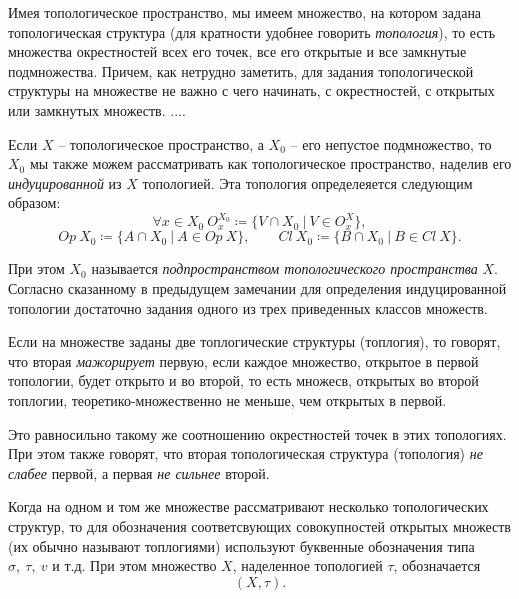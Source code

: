 \begin{remark}
	Имея топологическое пространство, мы имеем множество, на котором задана топологическая структура (для кратности удобнее говорить \emph{топология}), то есть множества окрестностей всех его точек, все его открытые и все замкнутые подмножества. Причем, как нетрудно заметить, для задания топологической структуры на множестве не важно с чего начинать, с окрестностей, с открытых или замкнутых множеств. ....
\end{remark}

\begin{definition}[Подпространство ТП]
	Если $X$ -- топологическое пространство, а $X_0$ -- его непустое подмножество, то $X_0$ мы также можем рассматривать как топологическое пространство, наделив его \emph{индуцированной} из $X$ топологией. Эта топология определеяется следующим образом:
	\[
		\forall x \in X_0 \ O_{x}^{X_0} \coloneq \big\{V \cap X_0 \ \big| \ V \in O_{x}^{X} \big\},
	\]
	\[
		Op \ X_0 \coloneq \big\{A \cap X_0 \ \big| \ A \in Op \ X\big\}, \qquad Cl \ X_0 \coloneq \big\{B \cap X_0 \ \big| \ B \in Cl \ X\big\}.
	\]

	При этом $X_0$ называется \emph{подпространством топологического пространства} $X$. Согласно сказанному в предыдущем замечании для определения индуцированной топологии достаточно задания одного из трех приведенных классов множеств.
\end{definition}

\begin{definition}
	Если на множестве заданы две топлогические структуры (топлогия), то говорят, что вторая \emph{мажорирует} первую, если каждое множество, открытое в первой топологии, будет открыто и во второй, то есть множесв, открытых во второй топлогии, теоретико-множественно не меньше, чем открытых в первой.

	Это равносильно такому же соотношению окрестностей точек в этих топологиях. При этом также говорят, что вторая топологическая структура (топология) \emph{не слабее} первой, а первая \emph{не сильнее} второй.
\end{definition}

\begin{remark}
	Когда на одном и том же множестве рассматривают несколько топологических структур, то для обозначения соответсвующих совокупностей открытых множеств (их обычно называют топлогиями) используют буквенные обозначения типа $\sigma , \ \tau , \ v$ и т.д. При этом множество $X$, наделенное топологией $\tau $, обозначается
	\[
		(X,\tau ).
	\]
\end{remark}

